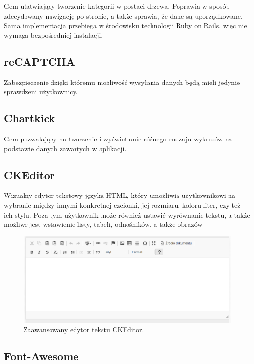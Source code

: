 \documentclass[brudnopis]{xmgr}
\begin{document}
Gem ułatwiający tworzenie kategorii w postaci drzewa. Poprawia w sposób zdecydowany nawigację
po stronie, a także sprawia, że dane są uporządkowane. Sama implementacja przebiega w środowisku
technologii Ruby on Rails, więc nie wymaga bezpośredniej instalacji.

\subsection{reCAPTCHA}

Zabezpieczenie dzięki któremu możliwość wysyłania danych będą mieli jedynie sprawdzeni użytkownicy.

\subsection{Chartkick} 

Gem pozwalający na tworzenie i wyświetlanie różnego rodzaju wykresów na podstawie danych zawartych w aplikacji.

\subsection{CKEditor} 

Wizualny edytor tekstowy języka HTML, który umożliwia użytkownikowi na wybranie między innymi konkretnej 
czcionki, jej rozmiaru, koloru liter, czy też ich stylu. Poza tym użytkownik może również ustawić wyrównanie tekstu,
a także możliwe jest wstawienie listy, tabeli, odnośników, a także obrazów.

\begin{figure}[!tbh]
\centering
\includegraphics[width=\linewidth]{fig/ckeditor}
\caption{Zaawansowany edytor tekstu CKEditor.}
\end{figure}

\subsection{Font-Awesome}
\end{document}
